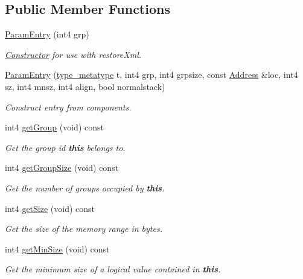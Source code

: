 \subsection*{Public Member Functions}
\begin{DoxyCompactItemize}
\item 
\mbox{\hyperlink{class_param_entry_a786d0b461f789499e59b84f91c4e4185}{Param\+Entry}} (int4 grp)
\begin{DoxyCompactList}\small\item\em \mbox{\hyperlink{class_constructor}{Constructor}} for use with restore\+Xml. \end{DoxyCompactList}\item 
\mbox{\hyperlink{class_param_entry_a14263620a380623342baad65d07a0948}{Param\+Entry}} (\mbox{\hyperlink{type_8hh_aef6429f2523cdf4d415ba04a0209e61f}{type\+\_\+metatype}} t, int4 grp, int4 grpsize, const \mbox{\hyperlink{class_address}{Address}} \&loc, int4 sz, int4 mnsz, int4 align, bool normalstack)
\begin{DoxyCompactList}\small\item\em Construct entry from components. \end{DoxyCompactList}\item 
int4 \mbox{\hyperlink{class_param_entry_a8bc3366591bc6e9a39cfa851052dc684}{get\+Group}} (void) const
\begin{DoxyCompactList}\small\item\em Get the group id {\bfseries{this}} belongs to. \end{DoxyCompactList}\item 
int4 \mbox{\hyperlink{class_param_entry_aa260212ed69b0efb8fc52aba0930ab11}{get\+Group\+Size}} (void) const
\begin{DoxyCompactList}\small\item\em Get the number of groups occupied by {\bfseries{this}}. \end{DoxyCompactList}\item 
int4 \mbox{\hyperlink{class_param_entry_a14b9358afc509b2d9df494ea6ecfbe31}{get\+Size}} (void) const
\begin{DoxyCompactList}\small\item\em Get the size of the memory range in bytes. \end{DoxyCompactList}\item 
int4 \mbox{\hyperlink{class_param_entry_a6cf83bdd06247d2ca0f6b5c663f94ecb}{get\+Min\+Size}} (void) const
\begin{DoxyCompactList}\small\item\em Get the minimum size of a logical value contained in {\bfseries{this}}. \end{DoxyCompactList}\item 

\end{DoxyCompactItemize}
